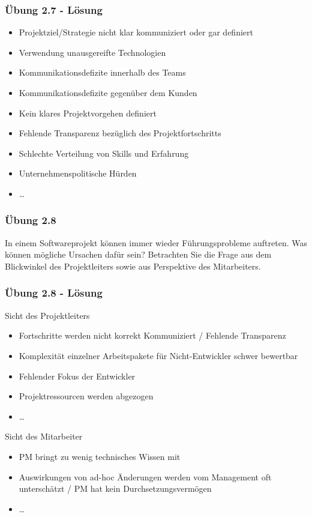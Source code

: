 \ifloesung
\begin{frame}[fragile]
\frametitle{Übung 2.7 - Lösung}
	\begin{itemize}
		\item Projektziel/Strategie nicht klar kommuniziert oder gar definiert
		\item Verwendung unausgereifte Technologien
		\item Kommunikationsdefizite innerhalb des Teams
		\item Kommunikationsdefizite gegenüber dem Kunden
		\item Kein klares Projektvorgehen definiert
		\item Fehlende Transparenz bezüglich des Projektfortschritts
		\item Schlechte Verteilung von Skills und Erfahrung
		\item Unternehmenspolitische Hürden
		\item \ldots
	\end{itemize}
\end{frame}
\fi

\begin{frame}
\frametitle{Übung 2.8}
	In einem Softwareprojekt können immer wieder Führungsprobleme auftreten.
	Was können mögliche Ursachen dafür sein? Betrachten Sie die Frage aus dem
	Blickwinkel des Projektleiters sowie aus Perspektive des Mitarbeiters.
\end{frame}

\ifloesung
\begin{frame}[fragile]
\frametitle{Übung 2.8 - Lösung}
	Sicht des Projektleiters
	\begin{itemize}
		\item Fortschritte werden nicht korrekt Kommuniziert / Fehlende Transparenz
		\item Komplexität einzelner Arbeitspakete für Nicht-Entwickler schwer
		bewertbar
		\item Fehlender Fokus der Entwickler
		\item Projektressourcen werden abgezogen
		\item \ldots
	\end{itemize}
	\bigskip
	Sicht des Mitarbeiter
	\begin{itemize}
		\item PM bringt zu wenig technisches Wissen mit
		\item Auswirkungen von ad-hoc Änderungen werden vom Management oft
		unterschätzt / PM hat kein Durchsetzungsvermögen
		\item \ldots
	\end{itemize}
\end{frame}
\fi

